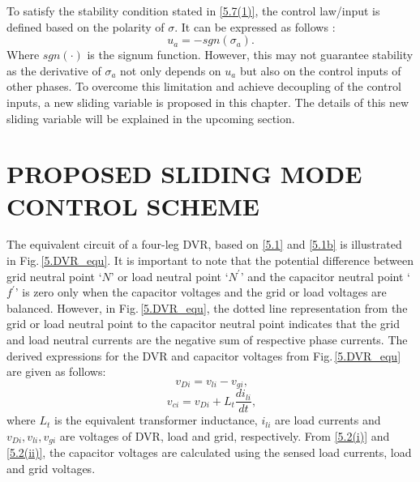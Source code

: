 To satisfy the stability condition stated in \eqref{5.7(1)}, the control law/input is defined based on the polarity of $\sigma$. It can be expressed as follows \cite{8466115}:
\begin{equation} \label{5.7(3)} %
u_{a} = - sgn(\sigma_{a}).
\end{equation}
Where $sgn(\cdot)$ is the signum function. However, this may not guarantee stability as the derivative of $\sigma_a$ not only depends on $u_a$ but also on the control inputs of other phases. To overcome this limitation and achieve decoupling of the control inputs, a new sliding variable is proposed in this chapter. The details of this new sliding variable will be explained in the upcoming section.

\vspace*{-1cm}
\section{PROPOSED SLIDING MODE CONTROL SCHEME}
The equivalent circuit of a four-leg DVR, based on \eqref{5.1} and \eqref{5.1b} is  illustrated in Fig.\,\ref{5.DVR_equ}. It is important to note that the potential difference between grid neutral point `$N$' or load neutral point `$N^{\prime}$' and the capacitor neutral point `$f^{\prime}$' is zero only when the capacitor voltages and the grid or load voltages are balanced. However, in Fig.\,\ref{5.DVR_equ}, the dotted line representation from the grid or load neutral point to the capacitor neutral point indicates that the grid and load neutral currents are the negative sum of respective phase currents. The derived expressions for the DVR and capacitor voltages from Fig.\,\ref{5.DVR_equ} are given as follows:
\begin{equation} \label{5.2(i)} %
\ v_{Di} = v_{li} - v_{gi},
\end{equation}
\begin{equation} \label{5.2(ii)} %
\ v_{ci} = v_{Di} + L_{t}\frac{di_{li}}{dt},
\end{equation}
where $L_{t}$ is the equivalent transformer inductance, $i_{li}$ are load currents and $v_{Di}, v_{li}, v_{gi} $ are voltages of DVR, load and grid, respectively. From \eqref{5.2(i)} and \eqref{5.2(ii)}, the capacitor voltages are calculated using the sensed load currents, load and grid voltages.

